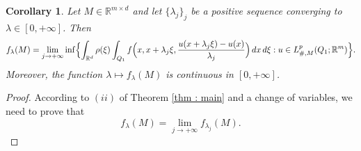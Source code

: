 \documentclass{article}
\newtheorem{corollary}[lemma]{Corollary}
\theoremstyle{definition}
\newcommand{\R}{\mathbb{R}}
\begin{document}
\begin{corollary}
    Let $M\in \R^{m\times d}$ and let $\{\lambda_j\}_j$ be a positive sequence converging to $\lambda\in[0,+\infty]$. Then 
    \begin{equation*}
    f_{\lambda}(M) = \lim_{j\to+\infty} \inf\Bigl\{ \int_{\R^d} \rho(\xi)\int_{Q_1} f\Bigl(x,x+\lambda_j\xi,\frac{u(x+\lambda_j\xi)-u(x)}{\lambda_j}\Bigr)\, dx\,d\xi : u\in L^p_{\#,M}(Q_1;\R^m) \Bigr\}.
\end{equation*}
    Moreover, the function $\lambda\mapsto f_\lambda(M)$ is continuous in $[0,+\infty]$.
\end{corollary}
\begin{proof}


According to $(ii)$ of Theorem \ref{thm : main} and a change of variables, we need to prove that
\begin{equation*}
    f_\lambda(M)=\lim_{j\to+\infty}f_{\lambda_j}(M).
\end{equation*}


\end{proof}
\end{document}
